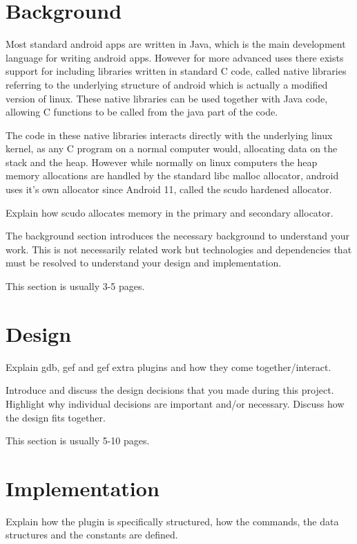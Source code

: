 \documentclass[a4paper,11pt,oneside]{report}
\begin{document}
\chapter{Background}

Most standard android apps are written in Java, which is the main development
language for writing android apps. However for more advanced uses there exists
support for including libraries written in standard C code, called native libraries
referring to the underlying structure of android which is actually a modified
version of linux. These native libraries can be used together with Java code,
allowing C functions to be called from the java part of the code.

The code in these native libraries interacts directly with the underlying linux
kernel, as any C program on a normal computer would, allocating data on the
stack and the heap. However while normally on linux computers the heap memory
allocations are handled by the standard libc malloc allocator, android uses it's
own allocator since Android 11, called the scudo hardened allocator.

Explain how scudo allocates memory in the primary and secondary allocator.

The background section introduces the necessary background to understand your
work. This is not necessarily related work but technologies and dependencies
that must be resolved to understand your design and implementation.

This section is usually 3-5 pages.


\chapter{Design}

Explain gdb, gef and gef extra plugins and how they come together/interact.

Introduce and discuss the design decisions that you made during this project.
Highlight why individual decisions are important and/or necessary. Discuss
how the design fits together.

This section is usually 5-10 pages.


\chapter{Implementation}

Explain how the plugin is specifically structured, how the commands, the data
structures and the constants are defined.
\end{document}
